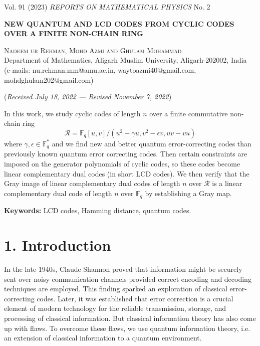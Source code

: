 \documentclass[12pt]{article}
\begin{document}
\begin{center}
Vol. 91 (2023) \quad \textit{REPORTS ON MATHEMATICAL PHYSICS} \quad No. 2
\end{center}

\begin{center}
\textbf{NEW QUANTUM AND LCD CODES FROM CYCLIC CODES} \\
\textbf{OVER A FINITE NON-CHAIN RING}
\end{center}

\begin{center}
\textsc{Nadeem ur Rehman, Mohd Azmi and Ghulam Mohammad} \\
Department of Mathematics, Aligarh Muslim University, Aligarh-202002, India \\
(e-mails: nu.rehman.mm@amu.ac.in, waytoazmi40@gmail.com, mohdghulam202@gmail.com)
\end{center}

\begin{center}
(\textit{Received July 18, 2022 — Revised November 7, 2022})
\end{center}

In this work, we study cyclic codes of length $n$ over a finite commutative non-chain ring 
\[
\mathcal{R} = \mathbb{F}_q[u,v]/(u^2 - \gamma u, v^2 - \epsilon v, uv - vu)
\]
where $\gamma, \epsilon \in \mathbb{F}_q^*$ and we find new and better quantum error-correcting codes than previously known quantum error correcting codes. Then certain constraints are imposed on the generator polynomials of cyclic codes, so these codes become linear complementary dual codes (in short LCD codes). We then verify that the Gray image of linear complementary dual codes of length $n$ over $\mathcal{R}$ is a linear complementary dual code of length $n$ over $\mathbb{F}_q$ by establishing a Gray map.

\textbf{Keywords:} LCD codes, Hamming distance, quantum codes.

\section*{1. Introduction}
In the late 1940s, Claude Shannon \cite{shannon1948} proved that information might be securely sent over noisy communication channels provided correct encoding and decoding techniques are employed. This finding sparked an exploration of classical error-correcting codes. Later, it was established that error correction is a crucial element of modern technology for the reliable transmission, storage, and processing of classical information. But classical information theory has also come up with flaws. To overcome these flaws, we use quantum information theory, i.e. an extension of classical information to a quantum environment.
\end{document}

